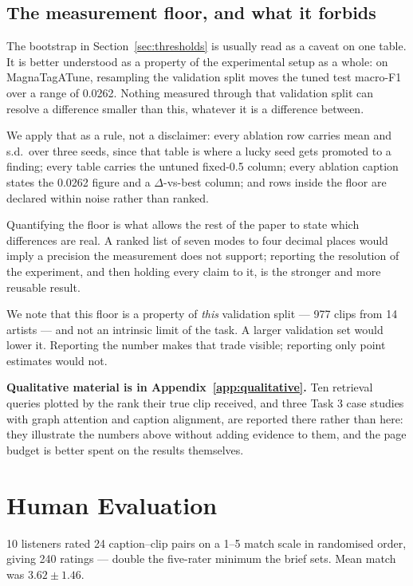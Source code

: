 \documentclass[conference]{IEEEtran}
\newcommand{\BootLeadSpread}{0.0262}
\newcommand{\HEItems}{24}
\newcommand{\HEMean}{3.62}
\newcommand{\HERaters}{10}
\newcommand{\HERatings}{240}
\newcommand{\HESd}{1.46}
\begin{document}
\subsection{The measurement floor, and what it forbids}
\label{sec:noisefloor}
The bootstrap in Section~\ref{sec:thresholds} is usually read as a caveat on one
table. It is better understood as a property of the experimental setup as a
whole: on MagnaTagATune, resampling the validation split moves the tuned test
macro-F1 over a range of \BootLeadSpread{}. Nothing measured through that
validation split can resolve a difference smaller than this, whatever it is a
difference between.

We apply that as a rule, not a disclaimer: every ablation row carries mean and
s.d.\ over three seeds, since that table is where a lucky seed gets promoted to
a finding; every table carries the untuned fixed-0.5 column; every ablation
caption states the \BootLeadSpread{} figure and a $\Delta$-vs-best column; and
rows inside the floor are declared within noise rather than ranked.

Quantifying the floor is what allows the rest of the paper to state which
differences are real. A ranked list of seven modes to four decimal places would
imply a precision the measurement does not support; reporting the resolution of
the experiment, and then holding every claim to it, is the stronger and more
reusable result.

We note that this floor is a property of \emph{this} validation split --- 977
clips from 14 artists --- and not an intrinsic limit of the task. A larger
validation set would lower it. Reporting the number makes that trade visible;
reporting only point estimates would not.

\textbf{Qualitative material is in Appendix~\ref{app:qualitative}.} Ten
retrieval queries plotted by the rank their true clip received, and three Task 3
case studies with graph attention and caption alignment, are reported there
rather than here: they illustrate the numbers above without adding evidence to
them, and the page budget is better spent on the results themselves.

\section{Human Evaluation}
\label{sec:human}
\HERaters{} listeners rated \HEItems{} caption--clip pairs on a 1--5 match scale
in randomised order, giving \HERatings{} ratings --- double the five-rater
minimum the brief sets. Mean match was $\HEMean{} \pm \HESd{}$.
\end{document}
